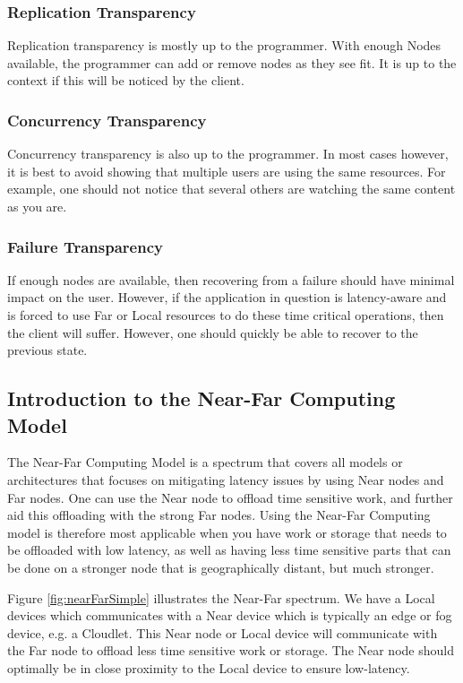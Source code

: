 \subsubsection{Replication Transparency}
Replication transparency is mostly up to the programmer. With enough Nodes available, the programmer can add or remove nodes as they see fit. It is up to the context if this will be noticed by the client. 

\subsubsection{Concurrency Transparency}
Concurrency transparency is also up to the programmer. In most cases however, it is best to avoid showing that multiple users are using the same resources. For example, one should not notice that several others are watching the same content as you are. 

\subsubsection{Failure Transparency}
If enough nodes are available, then recovering from a failure should have minimal impact on the user. However, if the application in question is latency-aware and is forced to use Far or Local resources to do these time critical operations, then the client will suffer. However, one should quickly be able to recover to the previous state.

\subsection{Introduction to the Near-Far Computing Model}
The Near-Far Computing Model is a spectrum that covers all models or architectures that focuses on mitigating latency issues by using Near nodes and Far nodes. One can use the Near node to offload time sensitive work, and further aid this offloading with the strong Far nodes. Using the Near-Far Computing model is therefore most applicable when you have work or storage that needs to be offloaded with low latency, as well as having less time sensitive parts that can be done on a stronger node that is geographically distant, but much stronger.

Figure \ref{fig:nearFarSimple} illustrates the Near-Far spectrum. We have a Local devices which communicates with a Near device which is typically an edge or fog device, e.g. a Cloudlet. This Near node or Local device will communicate with the Far node to offload less time sensitive work or storage. The Near node should optimally be in close proximity to the Local device to ensure low-latency.

